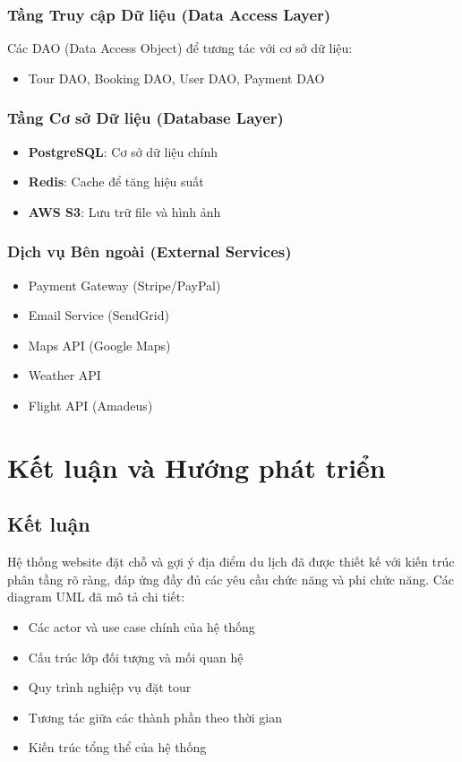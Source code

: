 \documentclass[12pt,a4paper]{article}
\begin{document}
\subsubsection{Tầng Truy cập Dữ liệu (Data Access Layer)}
Các DAO (Data Access Object) để tương tác với cơ sở dữ liệu:
\begin{itemize}
    \item Tour DAO, Booking DAO, User DAO, Payment DAO
\end{itemize}

\subsubsection{Tầng Cơ sở Dữ liệu (Database Layer)}
\begin{itemize}
    \item \textbf{PostgreSQL}: Cơ sở dữ liệu chính
    \item \textbf{Redis}: Cache để tăng hiệu suất
    \item \textbf{AWS S3}: Lưu trữ file và hình ảnh
\end{itemize}

\subsubsection{Dịch vụ Bên ngoài (External Services)}
\begin{itemize}
    \item Payment Gateway (Stripe/PayPal)
    \item Email Service (SendGrid)
    \item Maps API (Google Maps)
    \item Weather API
    \item Flight API (Amadeus)
\end{itemize}

\section{Kết luận và Hướng phát triển}

\subsection{Kết luận}
Hệ thống website đặt chỗ và gợi ý địa điểm du lịch đã được thiết kế với kiến trúc phân tầng rõ ràng, đáp ứng đầy đủ các yêu cầu chức năng và phi chức năng. Các diagram UML đã mô tả chi tiết:

\begin{itemize}
    \item Các actor và use case chính của hệ thống
    \item Cấu trúc lớp đối tượng và mối quan hệ
    \item Quy trình nghiệp vụ đặt tour
    \item Tương tác giữa các thành phần theo thời gian
    \item Kiến trúc tổng thể của hệ thống
\end{itemize}
\end{document}
